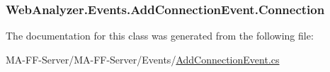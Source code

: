 \subsubsection[{Connection}]{ Web\+Analyzer.\+Events.\+Add\+Connection\+Event.\+Connection\hspace{0.3cm}{\ttfamily [get]}}\label{class_web_analyzer_1_1_events_1_1_add_connection_event_a0ae15899a3e51b1831f5f310436de660}


The documentation for this class was generated from the following file\+:\begin{DoxyCompactItemize}
\item 
M\+A-\/\+F\+F-\/\+Server/\+M\+A-\/\+F\+F-\/\+Server/\+Events/\hyperlink{_add_connection_event_8cs}{Add\+Connection\+Event.\+cs}\end{DoxyCompactItemize}
